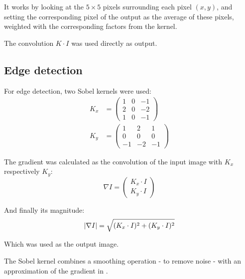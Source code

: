 \documentclass[a4paper]{scrreprt}
\DeclarePairedDelimiter\abs{\lvert}{\rvert}
\begin{document}
It works by looking at the $5 \times 5$ pixels surrounding each pixel $(x, y)$,
and setting the corresponding pixel of the output as the average of these
pixels, weighted with the corresponding factors from the kernel.

The convolution $K \cdot I$ was used directly as output.

\subsection{Edge detection}

For edge detection, two Sobel kernels were used:
\begin{align*}
		K_x & = \begin{pmatrix}
				1 & 0 & -1 \\
				2 & 0 & -2 \\
				1 & 0 & -1
		\end{pmatrix} \\
		K_y &= \begin{pmatrix}
				1 & 2 & 1 \\
				0 & 0 & 0 \\
				-1 & -2 & -1
		\end{pmatrix}
\end{align*}

The gradient was calculated as the convolution of the input image with $K_x$
respectively $K_y$:
\[
		\nabla I = \begin{pmatrix}
				K_x \cdot I \\
				K_y \cdot I
		\end{pmatrix}
\]

And finally its magnitude:
\[
		\abs{\nabla I} = \sqrt{(K_x \cdot I)^2 + (K_y \cdot I)^2}
\]

Which was used as the output image.

The Sobel kernel combines a smoothing operation - to remove noise - with an
approximation of the gradient in .
\end{document}
